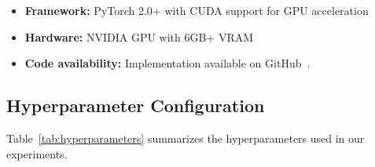 \documentclass[conference]{IEEEtran}
\begin{document}
\begin{itemize}
    \item \textbf{Framework:} PyTorch 2.0+ with CUDA support for GPU acceleration
    \item \textbf{Hardware:} NVIDIA GPU with 6GB+ VRAM
    \item \textbf{Code availability:} Implementation available on GitHub~\cite{gruxnet_github}.
\end{itemize}

\subsection{Hyperparameter Configuration}

Table~\ref{tab:hyperparameters} summarizes the hyperparameters used in our experiments.
\end{document}
